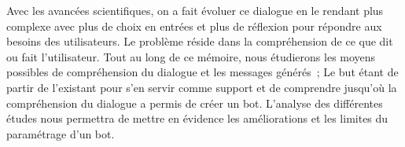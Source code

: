 	Avec les avancées scientifiques, on a fait évoluer ce dialogue en le rendant plus complexe avec plus de choix en entrées et plus de réflexion pour répondre aux besoins des utilisateurs. Le problème réside dans la compréhension de ce que dit ou fait l’utilisateur. Tout au long de ce mémoire, nous étudierons les moyens possibles de compréhension du dialogue et les messages générés ;  Le but étant de partir de l’existant pour s’en servir comme support et de comprendre jusqu’où la compréhension du dialogue a permis de créer un bot. L’analyse des différentes études nous permettra de mettre en évidence les améliorations et les limites du paramétrage d’un bot.


\clearpage

